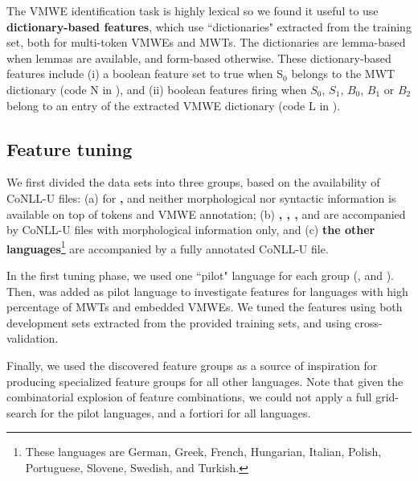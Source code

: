 \documentclass[output=paper,modfonts]{langscibook}
\begin{document}
The VMWE identification task is highly lexical so we found it useful to use \textbf{dictionary-based features}, which use ``dictionaries" extracted from the training set, both for multi-token VMWEs and MWTs. The dictionaries are lemma-based when lemmas are available, and form-based otherwise. These dictionary-based features include (i) a boolean feature set to true when S$_0$ belongs to the MWT dictionary (code N in  ), and (ii) boolean features firing when $S_0$, $S_1$, $B_0$, $B_1$ or $B_2$ belong to an entry of the extracted VMWE dictionary (code L in ).
\subsection{Feature tuning}
\label{ss:tuning}
We first divided the data sets into three groups, based on the availability of CoNLL-U files: (a) for \textbf{, } and \textbf{} neither morphological nor syntactic information is available on top of tokens and VMWE annotation; (b) \textbf{, , , } and \textbf{} are accompanied by CoNLL-U files with morphological information only, and (c) \textbf{the other languages}\footnote{These languages are German, Greek, French, Hungarian, Italian, Polish, Portuguese, Slovene, Swedish, and Turkish.} 
are accompanied by a fully annotated CoNLL-U file. 

In the first tuning phase, we used one ``pilot" language for each group (,  and ). Then,  was added as pilot language to investigate features for languages with high percentage of MWTs and embedded VMWEs. We tuned the features using both development sets extracted from the provided training sets, and using cross-validation.

Finally, we used the discovered feature groups as a source of inspiration for producing specialized feature groups for all other languages. Note that given the combinatorial explosion of feature combinations, we could not apply a full grid-search for the pilot languages, and a fortiori for all languages.
\end{document}
